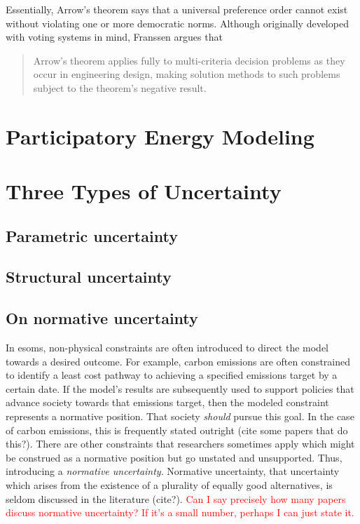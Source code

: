 Essentially, Arrow's theorem says that a universal preference order cannot exist
without violating one or more democratic norms. Although originally developed
with voting systems in mind, Franssen argues
that \blockcquote[p. 42]{franssen_arrows_2005}{Arrow’s theorem applies fully to
multi-criteria decision problems as they occur in engineering design, making
solution methods to such problems subject to the theorem’s negative result.}

\section{Participatory Energy Modeling}
\label{section:participation-modeling}

\section{Three Types of Uncertainty}
\label{section:triple-uncertainty}

\subsection{Parametric uncertainty}

\subsection{Structural uncertainty}

\subsection{On normative uncertainty}
In \acp{esom}, non-physical constraints are often introduced to direct the model
towards a desired outcome. For example, carbon emissions are often constrained
to identify a least cost pathway to achieving a specified emissions target by a
certain date. If the model's results are subsequently used to support policies
that advance society towards that emissions target, then the modeled constraint
represents a normative position. That society \textit{should} pursue this goal.
In the case of carbon emissions, this is frequently stated outright (cite some
papers that do this?). There are other constraints that researchers sometimes
apply which might be construed as a normative position but go unstated and
unsupported. Thus, introducing a \textit{normative uncertainty}. Normative
uncertainty, that uncertainty which arises from the existence of a plurality of
equally good alternatives, is seldom discussed in the literature (cite?).
\textcolor{red}{Can I say precisely how many papers discuss normative
uncertainty? If it's a small number, perhaps I can just state it.}


